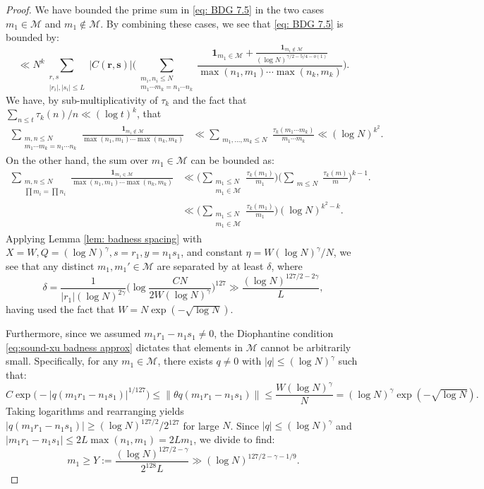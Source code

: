 \documentclass[12pt]{amsart}
\renewcommand{\le}{\leqslant}
\renewcommand{\leq}{\leqslant}
\renewcommand{\ge}{\geqslant}
\numberwithin{equation}{section}
\theoremstyle{plain}
\theoremstyle{definition}
\newcommand{\CM}{\mathcal{M}}
\begin{document}
\begin{proof}
		We have bounded the prime sum in \eqref{eq: BDG 7.5} in the two cases $m_1 \in \CM$ and $m_1 \not \in \CM$. By combining these cases, we see that \eqref{eq: BDG 7.5} is bounded by:
		\begin{equation}\label{eq: BDG 8}
			\ll  N^{k}\sum_{\substack{r, s \\ |r_i|,|s_i| \leq L}}|C(\bm{r,s})|\bigg(\sum_{\substack{m_i, n_i \leq N \\  m_1\cdots m_k= n_1 \cdots n_k}} \frac{\bm{1}_{m_1 \in \CM} + \frac{\bm{1}_{m_1 \not\in \CM}}{(\log N)^{\gamma/2-5/4-o(1)}} }{\max(n_1,m_1) \cdots \max(n_k,m_k)} \bigg).
		\end{equation}
		We have, by sub-multiplicativity of $\tau_k$ and the fact that $\sum_{n \leq t}\tau_k(n)/n \ll (\log t)^k$, that
		\begin{align}\label{eq: BDG 12}
			\sum_{\substack{m, n \leq N\\ m_1\cdots m_k= n_1 \cdots n_k}}  \frac{\bm{1}_{m_1 \not\in \CM}}{\max(n_1,m_1) \cdots \max(n_k,m_k)} &\ll  \sum_{\substack{m_1,\dots, m_k\leq N}}  \frac{\tau_k(m_1 \cdots m_k)}{m_1 \cdots m_k} \ll (\log N)^{k^2}.
		\end{align}
		On the other hand, the sum over $m_1 \in \CM$ can be bounded as:
		\begin{align}
			\sum_{\substack{m, n \leq N\\ \prod m_i=\prod n_i}}  \frac{\bm{1}_{m_1 \in \CM}}{\max(n_1,m_1) \cdots \max(n_k,m_k)} &\ll \bigg(\sum_{\substack{m_1 \leq N\\ m_1 \in \CM}} \frac{\tau_k(m_1)}{m_1}\bigg)\bigg( \sum_{\substack{m \leq N}}  \frac{\tau_k(m)}{m}\bigg)^{k-1}. \label{eq: BDG 10}\\
			& \nonumber \ll   \bigg(\sum_{\substack{m_1 \leq N\\ m_1 \in \CM}} \frac{\tau_k(m_1)}{m_1}\bigg)(\log N)^{k^2-k}. 
		\end{align}
		Applying Lemma \ref{lem: badness spacing} with $X=W, Q=(\log N)^\gamma, s=r_1, y=n_1s_1$, and constant $\eta = W(\log N)^\gamma/N$, we see that any distinct $m_1, m_1' \in \CM$ are separated by at least $\delta$, where
		$$ \delta = \frac{1}{|r_1| (\log N)^{2\gamma}} \bigg( \log \frac{C N}{2 W (\log N)^\gamma} \bigg)^{127} \gg \frac{(\log N)^{127/2 - 2\gamma}}{L}, $$
		having used the fact that $W = N \exp(-\sqrt{\log N})$. 
		
		Furthermore, since we assumed $m_1r_1 - n_1s_1 \ne 0$, the Diophantine condition \eqref{eq:sound-xu badness approx} dictates that elements in $\CM$ cannot be arbitrarily small. Specifically, for any $m_1 \in \CM$, there exists $q \ne 0$ with $|q| \le (\log N)^\gamma$ such that:
		$$ C \exp\big(-|q(m_1r_1 - n_1s_1)|^{1/127}\big) \le \|\theta q (m_1r_1-n_1s_1)\| \le \frac{W(\log N)^\gamma}{N} = (\log N)^\gamma \exp(-\sqrt{\log N}). $$
		Taking logarithms and rearranging yields $|q(m_1r_1 - n_1s_1)| \ge (\log N)^{127/2}/2^{127}$ for large $N$. Since $|q| \le (\log N)^\gamma$ and $|m_1r_1 - n_1s_1| \le 2L \max(n_1, m_1) = 2L m_1$, we divide to find:
		$$ m_1 \ge Y := \frac{(\log N)^{127/2 - \gamma}}{2^{128} L} \gg (\log N)^{127/2 - \gamma - 1/9}. $$
		

\end{proof}
\end{document}
